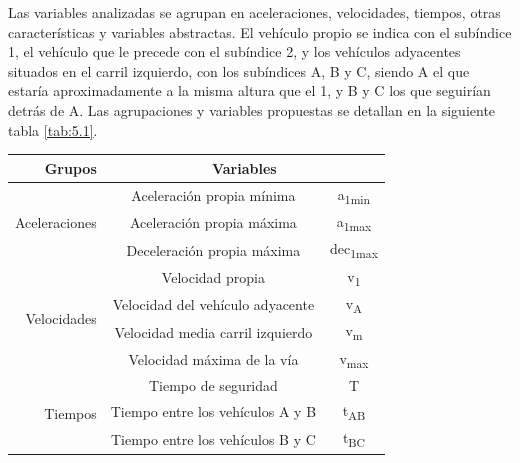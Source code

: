 Las variables analizadas se agrupan en aceleraciones, velocidades, tiempos, otras características y variables abstractas. El vehículo propio se indica con el subíndice 1, el vehículo que le precede con el subíndice 2, y los vehículos adyacentes situados en el carril izquierdo, con los subíndices A, B y C, siendo A el que estaría aproximadamente a la misma altura que el 1, y B y C los que seguirían detrás de A. Las agrupaciones y variables propuestas se detallan en la siguiente tabla \ref{tab:5.1}.

\begin{table}[h]
\centering
\begin{tabular}{rcc}
\textbf{Grupos}                        & \multicolumn{2}{c}{\textbf{Variables}}                                \\ \hline
\multirow{3}{*}{Aceleraciones}         & Aceleración   propia mínima                              & a\textsubscript{1min}    \\ \cline{2-3} 
                                       & Aceleración   propia máxima                              & a\textsubscript{1max}   \\ \cline{2-3} 
                                       & Deceleración   propia máxima                             & dec\textsubscript{1max} 
                                       \\ \hline
\multirow{4}{*}{Velocidades}           & Velocidad   propia                                       & v\textsubscript{1}       \\ \cline{2-3} 
                                       & Velocidad   del vehículo adyacente                       & v\textsubscript{A}       \\ \cline{2-3} 
                                       & Velocidad   media carril izquierdo                       & v\textsubscript{m}       \\ \cline{2-3} 
                                       & Velocidad   máxima de la vía                             & v\textsubscript{max}     \\ \hline
\multirow{3}{*}{Tiempos}               & Tiempo de   seguridad                                    & T          \\ \cline{2-3} 
                                       & Tiempo entre   los vehículos A y B                       & t\textsubscript{AB}      \\ \cline{2-3} 
                                       & Tiempo entre   los vehículos B y C                       & t\textsubscript{BC}      \\ \hline

\end{tabular}
\end{table}
